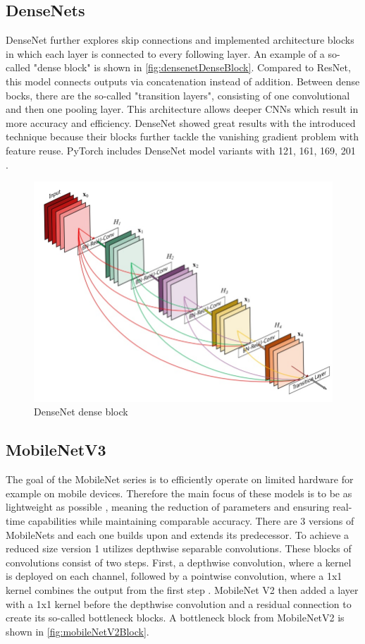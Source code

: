 \subsection{DenseNets}

DenseNet \cite{DenseNets} further explores skip connections and implemented architecture blocks in which each layer is connected to every following layer.
An example of a so-called "dense block" is shown in \autoref{fig:densenetDenseBlock}.
Compared to ResNet, this model connects outputs via concatenation instead of addition.
Between dense bocks, there are the so-called "transition layers", consisting of one convolutional and then one pooling layer.
This architecture allows deeper CNNs which result in more accuracy and efficiency.
DenseNet showed great results with the introduced technique because their blocks further tackle the vanishing gradient problem with feature reuse.
PyTorch includes DenseNet model variants with 121, 161, 169, 201 \cite{pytorchdensenet}.

\begin{figure}[H]
    \centering
    \includegraphics[width=0.5\linewidth]{PICs/backbones/densenet_denseBlock.jpg}
    \caption{DenseNet dense block \cite{DenseNets}}
    \label{fig:densenetDenseBlock}
\end{figure}

\subsection{MobileNetV3}

The goal of the MobileNet series \cite{MobileNetV3} is to efficiently operate on limited hardware for example on mobile devices.
Therefore the main focus of these models is to be as lightweight as possible \cite{networkArchitectureSurvey}, meaning the reduction of parameters and ensuring real-time capabilities while maintaining comparable accuracy.
There are 3 versions of MobileNets and each one builds upon and extends its predecessor.
To achieve a reduced size version 1 utilizes depthwise separable convolutions.
These blocks of convolutions consist of two steps. First, a depthwise convolution, where a kernel is deployed on each channel, followed by a pointwise convolution, where a 1x1 kernel combines the output from the first step \cite{networkArchitectureSurvey}.
MobileNet V2 then added a layer with a 1x1 kernel before the depthwise convolution and a residual connection to create its so-called bottleneck blocks.
A bottleneck block from MobileNetV2 is shown in \autoref{fig:mobileNetV2Block}.

